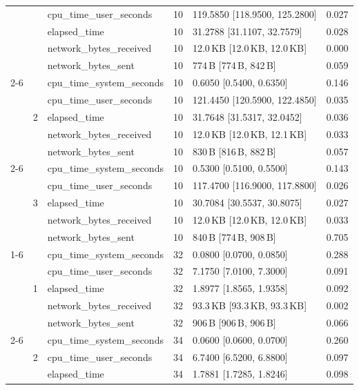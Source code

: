 \begin{tabular}{lllrll}
 &  & cpu_time_user_seconds & 10 & 119.5850 [118.9500, 125.2800] & 0.027 \\
 &  & elapsed_time & 10 & 31.2788 [31.1107, 32.7579] & 0.028 \\
 &  & network_bytes_received & 10 & 12.0\,KB [12.0\,KB, 12.0\,KB] & 0.000 \\
 &  & network_bytes_sent & 10 & 774\,B [774\,B, 842\,B] & 0.059 \\
\cline{2-6}
 & \multirow[t]{5}{*}{2} & cpu_time_system_seconds & 10 & 0.6050 [0.5400, 0.6350] & 0.146 \\
 &  & cpu_time_user_seconds & 10 & 121.4450 [120.5900, 122.4850] & 0.035 \\
 &  & elapsed_time & 10 & 31.7648 [31.5317, 32.0452] & 0.036 \\
 &  & network_bytes_received & 10 & 12.0\,KB [12.0\,KB, 12.1\,KB] & 0.033 \\
 &  & network_bytes_sent & 10 & 830\,B [816\,B, 882\,B] & 0.057 \\
\cline{2-6}
 & \multirow[t]{5}{*}{3} & cpu_time_system_seconds & 10 & 0.5300 [0.5100, 0.5500] & 0.143 \\
 &  & cpu_time_user_seconds & 10 & 117.4700 [116.9000, 117.8800] & 0.026 \\
 &  & elapsed_time & 10 & 30.7084 [30.5537, 30.8075] & 0.027 \\
 &  & network_bytes_received & 10 & 12.0\,KB [12.0\,KB, 12.0\,KB] & 0.033 \\
 &  & network_bytes_sent & 10 & 840\,B [774\,B, 908\,B] & 0.705 \\
\cline{1-6} \cline{2-6}
\multirow[t]{15}{*}{point-in-polygon-lookup-duckdb-small} & \multirow[t]{5}{*}{1} & cpu_time_system_seconds & 32 & 0.0800 [0.0700, 0.0850] & 0.288 \\
 &  & cpu_time_user_seconds & 32 & 7.1750 [7.0100, 7.3000] & 0.091 \\
 &  & elapsed_time & 32 & 1.8977 [1.8565, 1.9358] & 0.092 \\
 &  & network_bytes_received & 32 & 93.3\,KB [93.3\,KB, 93.3\,KB] & 0.002 \\
 &  & network_bytes_sent & 32 & 906\,B [906\,B, 906\,B] & 0.066 \\
\cline{2-6}
 & \multirow[t]{5}{*}{2} & cpu_time_system_seconds & 34 & 0.0600 [0.0600, 0.0700] & 0.260 \\
 &  & cpu_time_user_seconds & 34 & 6.7400 [6.5200, 6.8800] & 0.097 \\
 &  & elapsed_time & 34 & 1.7881 [1.7285, 1.8246] & 0.098 \\

\end{tabular}
